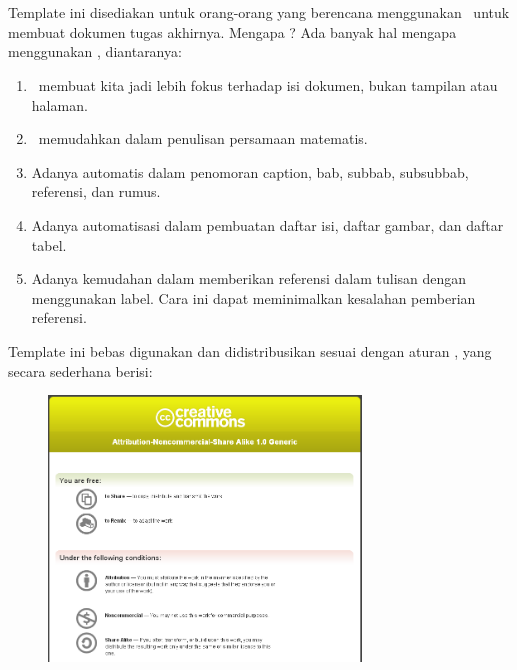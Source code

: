 \chapter*{\kataPengantar}
Template ini disediakan untuk orang-orang yang berencana menggunakan 
\latex~untuk membuat dokumen tugas akhirnya. 
Mengapa \latex? 
Ada banyak hal mengapa menggunakan \latex, diantaranya:

\begin{enumerate}
	\item \latex~membuat kita jadi lebih fokus terhadap isi dokumen, bukan 
		tampilan atau halaman. 
	\item \latex~memudahkan dalam penulisan persamaan matematis. 
	\item Adanya automatis dalam penomoran caption, bab, subbab, subsubbab, 
		referensi, dan rumus. 
	\item Adanya automatisasi dalam pembuatan daftar isi, daftar gambar, dan
		daftar tabel. 
	\item Adanya kemudahan dalam memberikan referensi dalam tulisan dengan 
		menggunakan label. Cara ini dapat meminimalkan kesalahan pemberian 
		referensi. 
\end{enumerate}

Template ini bebas digunakan dan 
didistribusikan sesuai dengan aturan \license, yang secara sederhana berisi: 

\begin{figure}
	\centering
	\includegraphics[width=0.74\textwidth]
		{assets/pics/creative_common.png}
	\caption{\license}
	\label{fig:lisensi}
\end{figure}


